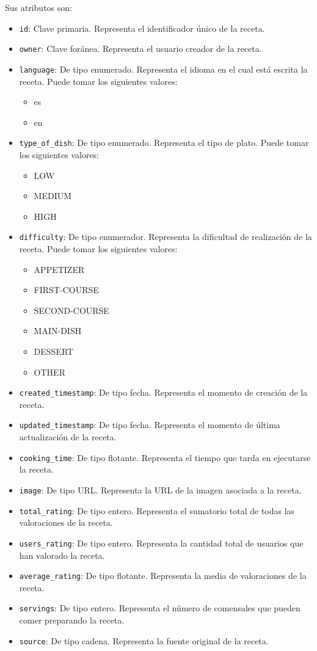 Sus atributos son:
\begin{itemize}
\item \texttt{id}: Clave primaria. Representa el identificador único de la
  receta.
\item \texttt{owner}: Clave foránea. Representa el usuario creador de la receta.
\item \texttt{language}: De tipo enumerado. Representa el idioma en el cual está
  escrita la receta. Puede tomar los siguientes valores:
  \begin{itemize}
  \item es
  \item en
  \end{itemize}
\item \texttt{type\_of\_dish}: De tipo enumerado. Representa el tipo de plato.
  Puede tomar los siguientes valores:
  \begin{itemize}
  \item LOW
  \item MEDIUM
  \item HIGH
  \end{itemize}
\item \texttt{difficulty}: De tipo enumerador. Representa la dificultad de
  realización de la receta. Puede tomar los siguientes valores:
  \begin{itemize}
  \item APPETIZER
  \item FIRST-COURSE
  \item SECOND-COURSE
  \item MAIN-DISH
  \item DESSERT
  \item OTHER
  \end{itemize}
\item \texttt{created\_timestamp}: De tipo fecha. Representa el momento de
  creación de la receta.
\item \texttt{updated\_timestamp}: De tipo fecha. Representa el momento de
  última actualización de la receta.
\item \texttt{cooking\_time}: De tipo flotante. Representa el tiempo que tarda
  en ejecutarse la receta.
\item \texttt{image}: De tipo URL. Representa la URL de la imagen asociada a la
  receta.
\item \texttt{total\_rating}: De tipo entero. Representa el sumatorio total de
  todas las valoraciones de la receta.
\item \texttt{users\_rating}: De tipo entero. Representa la cantidad total de
  usuarios que han valorado la receta.
\item \texttt{average\_rating}: De tipo flotante. Representa la media de
  valoraciones de la receta.
\item \texttt{servings}: De tipo entero. Representa el número de comensales que
  pueden comer preparando la receta.
\item \texttt{source}: De tipo cadena. Representa la fuente original de la
  receta.
\end{itemize}

